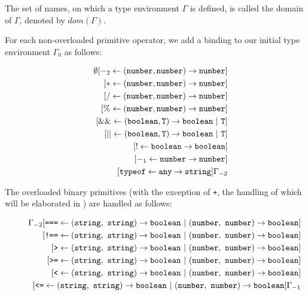 The set of names, on which a type environment
$\Gamma$ is defined, is called the domain of $\Gamma$, 
denoted by $\textit{dom}(\Gamma)$.

For each non-overloaded primitive operator, we add a binding to our initial
type environment $\Gamma_0$ as follows:

\begin{eqnarray*}
& &
       \emptyset[ -_2 \leftarrow  (\texttt{number}, \texttt{number}) \rightarrow \texttt{number}]\\
&& \hspace{2mm} [ * \leftarrow  (\texttt{number}, \texttt{number}) \rightarrow \texttt{number}]\\
&& \hspace{2mm} [ / \leftarrow  (\texttt{number}, \texttt{number}) \rightarrow \texttt{number}]\\
&& \hspace{2mm} [ \% \leftarrow (\texttt{number}, \texttt{number}) \rightarrow \texttt{number}]\\
&& \hspace{2mm} [ \&\& \leftarrow (\texttt{boolean}, \texttt{T}) \rightarrow \texttt{boolean}\ |\ \texttt{T}]\\
&& \hspace{2mm} [ || \leftarrow   (\texttt{boolean}, \texttt{T}) \rightarrow \texttt{boolean}\ |\ \texttt{T}]\\
&& \hspace{2mm} [ ! \leftarrow \texttt{boolean} \rightarrow \texttt{boolean}]\\
&& \hspace{2mm} [ -_1 \leftarrow \texttt{number} \rightarrow \texttt{number}]\\
&& \hspace{2mm} [ \texttt{typeof} \leftarrow \texttt{any} \rightarrow \texttt{string}]\Gamma_{-2}
\end{eqnarray*}

The overloaded binary primitives (with the exception of \texttt{+}, the handling of which will be elaborated in )
are handled as follows:

\begin{eqnarray*}
 & &
      \Gamma_{-2}
                 [ \texttt{===} \leftarrow (\texttt{string},\ \texttt{string}) \rightarrow \texttt{boolean}\ |\ (\texttt{number},\ \texttt{number}) \rightarrow \texttt{boolean}] \\
&& \hspace{6mm}  [ \texttt{!==} \leftarrow (\texttt{string},\ \texttt{string}) \rightarrow \texttt{boolean}\ |\ (\texttt{number},\ \texttt{number}) \rightarrow \texttt{boolean}] \\
&& \hspace{6mm}  [ \texttt{>} \leftarrow (\texttt{string},\ \texttt{string}) \rightarrow \texttt{boolean}\ |\ (\texttt{number},\ \texttt{number}) \rightarrow \texttt{boolean}]\\
&& \hspace{6mm}  [ \texttt{>=} \leftarrow (\texttt{string},\ \texttt{string}) \rightarrow \texttt{boolean}\ |\ (\texttt{number},\ \texttt{number}) \rightarrow \texttt{boolean}]\\
&& \hspace{6mm}  [ \texttt{<} \leftarrow (\texttt{string},\ \texttt{string}) \rightarrow \texttt{boolean}\ |\ (\texttt{number},\ \texttt{number}) \rightarrow \texttt{boolean}] \\
&& \hspace{6mm}  [ \texttt{<=} \leftarrow (\texttt{string},\ \texttt{string}) \rightarrow \texttt{boolean}\ |\ (\texttt{number},\ \texttt{number}) \rightarrow \texttt{boolean}]\Gamma_{-1}
\end{eqnarray*}


